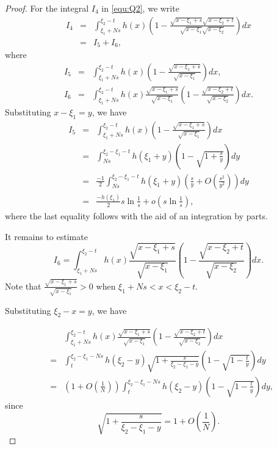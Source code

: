 \documentclass[11pt]{amsart}
\theoremstyle{plain}
\begin{document}
\begin{proof}
For the integral $I_4$ in \eqref{equ:Q2}, we write
\begin{eqnarray*}
   I_4 &=& \int_{\xi_1+Ns}^{\xi_2-t} h(x)\left(1-\frac{\sqrt{x-\xi_1+s}\sqrt{x-\xi_2+t}}{\sqrt{x-\xi_1}\sqrt{x-\xi_2}}\right)dx \\
    &=& I_5+I_6, 
    \end{eqnarray*}
    where
  \begin{eqnarray*} 
  I_5 &=& \int_{\xi_1+Ns}^{\xi_2-t}h(x)\left(1-\frac{\sqrt{x-\xi_1+s}}{\sqrt{x-\xi_1}}\right)dx, \\
  I_6 &=& \int_{\xi_1+Ns}^{\xi_2-t}  h(x) \frac{\sqrt{x-\xi_1+s}}{\sqrt{x-\xi_1}} \left(1-\frac{\sqrt{x-\xi_2+t}}{\sqrt{x-\xi_2}}\right)dx.
\end{eqnarray*}
Substituting $x-\xi_1=y$, we have 
\begin{eqnarray*}
I_5 &=& \int_{\xi_1+Ns}^{\xi_2-t}h(x) \left(1-\frac{\sqrt{x-\xi_1+s}}{\sqrt{x-\xi_1}}\right)dx \\
&=& \int_{Ns}^{\xi_2-\xi_1-t} h(\xi_1+y) \left(1-\sqrt{1+\frac{s}{y}}\right) dy\\
&=& \frac{-1}{2} \int_{Ns}^{\xi_2-\xi_1-t} h(\xi_1+y) \left( \frac{s}{y}  +O\left(\frac{s^2}{y^2}\right)\right) dy\\
&=& \frac{-h(\xi_1)}{2}s\ln \frac{1}{s}+o\left(s\ln \frac{1}{s}\right),
\end{eqnarray*}
where the last equality follows with the aid of an integration by parts.


It remains to estimate 
$$I_6=\int_{\xi_1+Ns}^{\xi_2-t}  h(x) \frac{\sqrt{x-\xi_1+s}}{\sqrt{x-\xi_1}} \left(1-\frac{\sqrt{x-\xi_2+t}}{\sqrt{x-\xi_2}}\right)dx.$$
Note that  $\frac{\sqrt{x-\xi_1+s}}{\sqrt{x-\xi_1}}>0$
when  $\xi_1+Ns<x<\xi_2-t$.


Substituting $\xi_2-x=y$, we have 

\begin{eqnarray*}
&& \int_{\xi_1+Ns}^{\xi_2-t}  h(x) \frac{\sqrt{x-\xi_1+s}}{\sqrt{x-\xi_1}} \left(1-\frac{\sqrt{x-\xi_2+t}}{\sqrt{x-\xi_2}}\right)dx \\
&=&  \int_{t}^{\xi_2-\xi_1-Ns}  h(\xi_2-y) \sqrt{1+\frac{s}{\xi_2-\xi_1-y}}
 \left(1- \sqrt{1- \frac{t}{y}}\right)dy \\
 &=& \left( 1+ O\left(\frac{1}{N}\right)\right) \int_{t}^{\xi_2-\xi_1-Ns}  h(\xi_2-y)
 \left(1- \sqrt{1- \frac{t}{y}}\right)dy, 
\end{eqnarray*}
since
$$\sqrt{1+\frac{s}{\xi_2-\xi_1-y}}=1+ O\left(\frac{1}{N}\right).$$


\end{proof}
\end{document}
